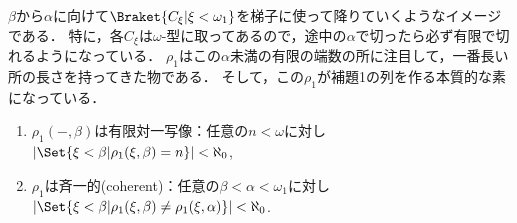 \documentclass[a4j]{ltjsarticle}
\begin{document}
$\beta$から$\alpha$に向けて$\Braket{C_\xi | \xi < \omega_1}$を梯子に使って降りていくようなイメージである．
特に，各$C_\xi$は$\omega$-型に取ってあるので，途中の$\alpha$で切ったら必ず有限で切れるようになっている．
$\rho_1$はこの$\alpha$未満の有限の端数の所に注目して，一番長い所の長さを持ってきた物である．
そして，この$\rho_1$が補題1の列を作る本質的な素になっている．

\begin{lemma}\label{lem:rho1-prop}
 \begin{enumerate}
  \item $\rho_1(-, \beta)$は有限対一写像：任意の$n < \omega$に対し$|\Set{\xi < \beta | \rho_1(\xi, \beta) = n}| < \aleph_0$,
  \item $\rho_1$は斉一的(coherent)：任意の$\beta < \alpha < \omega_1$に対し$|\Set{\xi < \beta | \rho_1(\xi, \beta) \neq \rho_1(\xi, \alpha)}| < \aleph_0$.
 \end{enumerate}
\end{lemma}
\end{document}
